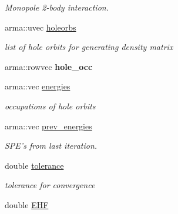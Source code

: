 \begin{DoxyCompactItemize}
\begin{DoxyCompactList}\small\item\em Monopole 2-\/body interaction. \end{DoxyCompactList}\item 
\hypertarget{classHartreeFock_a9700861effb1cb3739240b76ed519141}{arma\-::uvec \hyperlink{classHartreeFock_a9700861effb1cb3739240b76ed519141}{holeorbs}}\label{classHartreeFock_a9700861effb1cb3739240b76ed519141}

\begin{DoxyCompactList}\small\item\em list of hole orbits for generating density matrix \end{DoxyCompactList}\item 
\hypertarget{classHartreeFock_a0c11fc0a59ceaeeb415a0e6c8d85e604}{arma\-::rowvec {\bfseries hole\-\_\-occ}}\label{classHartreeFock_a0c11fc0a59ceaeeb415a0e6c8d85e604}

\item 
arma\-::vec \hyperlink{classHartreeFock_a415fc1fbbba3a6a84d47e31ed18323c9}{energies}
\begin{DoxyCompactList}\small\item\em occupations of hole orbits \end{DoxyCompactList}\item 
\hypertarget{classHartreeFock_a43e2a195ad044947a9e1fb9f3a937d8a}{arma\-::vec \hyperlink{classHartreeFock_a43e2a195ad044947a9e1fb9f3a937d8a}{prev\-\_\-energies}}\label{classHartreeFock_a43e2a195ad044947a9e1fb9f3a937d8a}

\begin{DoxyCompactList}\small\item\em S\-P\-E's from last iteration. \end{DoxyCompactList}\item 
\hypertarget{classHartreeFock_a22c754579ad1a45f053a5305e87d4700}{double \hyperlink{classHartreeFock_a22c754579ad1a45f053a5305e87d4700}{tolerance}}\label{classHartreeFock_a22c754579ad1a45f053a5305e87d4700}

\begin{DoxyCompactList}\small\item\em tolerance for convergence \end{DoxyCompactList}\item 
\hypertarget{classHartreeFock_a16c9e1791919c2ceef5584bdc9b84a81}{double \hyperlink{classHartreeFock_a16c9e1791919c2ceef5584bdc9b84a81}{E\-H\-F}}\label{classHartreeFock_a16c9e1791919c2ceef5584bdc9b84a81}


\end{DoxyCompactItemize}
